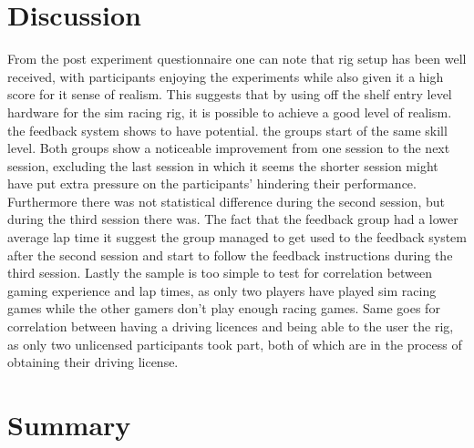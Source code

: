 \section{Discussion}
\label{sec:eval-Discussion}
From the post experiment questionnaire one can note that rig setup has been well received, with participants enjoying the experiments while also given it a high score for it sense of realism. This suggests that by using off the shelf entry level hardware for the sim racing rig, it is possible to achieve a good level of realism. the feedback system shows to have potential. the groups start of the same skill level. Both groups show a noticeable improvement from one session to the next session, excluding the last session in which it seems the shorter session might have put extra pressure on the participants' hindering their performance. Furthermore there was not statistical difference during the second session, but during the third session there was. The fact that the feedback group had a lower average lap time it suggest the group managed to get used to the feedback system after the second session and start to follow the feedback instructions during the third session. Lastly the sample is too simple to test for correlation between gaming experience and lap times, as only two players have played sim racing games while the other gamers don't play enough racing games. Same goes for correlation between having a driving licences and being able to the user the rig, as only two unlicensed participants took part, both of which are in the process of obtaining their driving license.

\section{Summary}
